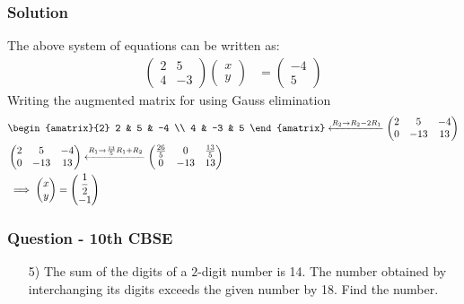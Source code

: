 \documentclass{beamer}
\begin{document}
\begin{frame}
\frametitle{Solution}
The above system of equations can be written as:
\begin{align}
    \begin{pmatrix}
        2 & 5\\ 
        4 & -3
    \end{pmatrix}
    \begin{pmatrix}
        x\\
        y
    \end{pmatrix} &= \begin{pmatrix}
        -4\\
        5
    \end{pmatrix} \label{8}
    \end{align}
    Writing the augmented matrix for using Gauss elimination
    \begin{align}
        &\begin{amatrix}{2}
   2 & 5 & -4 \\  4 & -3 & 5
 \end{amatrix} \xleftarrow{R_2 \to R_2-2R_1}
  \begin{pmatrix}
   2 & 5 & -4 \\  0 & -13 & 13
 \end{pmatrix} 
 \\
&\begin{pmatrix}
   2 & 5 & -4 \\  0 & -13 & 13
 \end{pmatrix} \xleftarrow{R_1 \to \frac{13}{5}R_1+R_2}
 \begin{pmatrix}
   \frac{26}{5} & 0 & \frac{13}{5} \\  0 & -13 & 13
 \end{pmatrix}  \label{14}
 \\
    & \implies \begin{pmatrix}
        x\\
        y
    \end{pmatrix} =
    \begin{pmatrix}
        \dfrac{1}{2}\\
        -1
    \end{pmatrix}
    \end{align}
\end{frame}






\begin{frame}
\frametitle{Question - 10th CBSE}
\begin{enumerate}
    \item[5)]
The sum of the digits of a $2$-digit number is 14. The number obtained by interchanging     its digits exceeds the given number by 18. Find the number.
\end{enumerate}
\end{frame}
\end{document}
